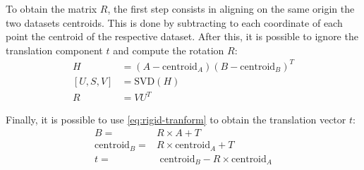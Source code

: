 To obtain the matrix $R$, the first step consists in aligning on the same origin the two datasets centroids. This is done by subtracting to each coordinate of each point the centroid of the respective dataset. After this, it is possible to ignore the translation component $t$ and compute the rotation $R$:
\begin{equation}
    \begin{aligned}
        H         & = (A-\textrm{centroid}_A)(B-\textrm{centroid}_B)^T \\
        [U, S, V] & = \textrm{SVD}(H)                                          \\
        R         & = VU^T
    \end{aligned}
    \label{eq:rotation-matrix}
\end{equation}

Finally, it is possible to use \cref{eq:rigid-tranform} to obtain the translation vector $t$:
\begin{equation}
    \begin{aligned}
        B =                   & R\times A + T                                     \\
        \textrm{centroid}_B = & R\times \textrm{centroid}_A + T                   \\
        t =                   & \textrm{ centroid}_B - R\times \textrm{centroid}_A
    \end{aligned}
    \label{eq:translation-vector}
\end{equation}

